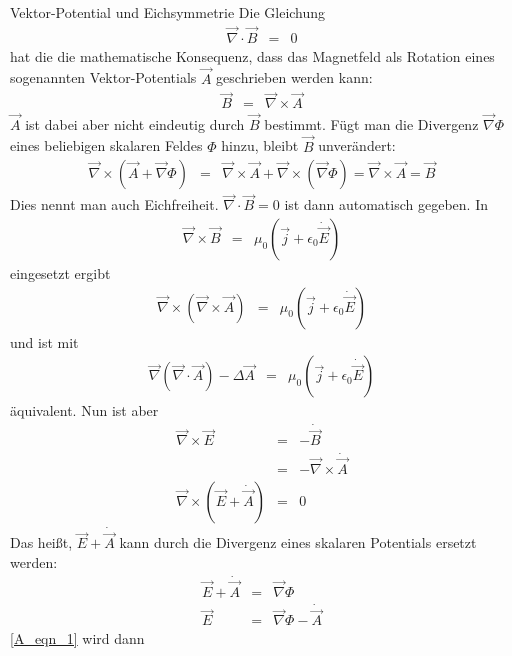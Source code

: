 \begin{chapter}{\titlestr}
\begin{section}{Vektor-Potential und Eichsymmetrie}
Die Gleichung
\begin{eqnarray*}
\vec{\nabla}\cdot\vec{B} &=& 0
\end{eqnarray*}
hat die die mathematische Konsequenz, dass das Magnetfeld als Rotation eines sogenannten Vektor-Potentials $\vec{A}$ geschrieben werden kann:
\begin{eqnarray*}
\vec{B} &=& \vec{\nabla}\times \vec{A}
\end{eqnarray*}
$\vec{A}$ ist dabei aber nicht eindeutig durch $\vec{B}$ bestimmt. Fügt man die Divergenz $\vec{\nabla}\Phi$ eines beliebigen skalaren Feldes $\Phi$ hinzu, bleibt $\vec{B}$ unverändert:
\begin{eqnarray*}
\vec{\nabla}\times \left(\vec{A}+\vec{\nabla}\Phi\right)
&=& \vec{\nabla}\times \vec{A}+\vec{\nabla}\times \left(\vec{\nabla}\Phi\right)=\vec{\nabla}\times \vec{A} = \vec{B}
\end{eqnarray*}
Dies nennt man auch Eichfreiheit. $\vec{\nabla}\cdot\vec{B}=0$ ist dann automatisch gegeben. In
\begin{eqnarray*}
\vec{\nabla}\times\vec{B} &=& \mu_0\left(\vec{j}+\epsilon_0\dot{\vec{E}}\right)
\end{eqnarray*}
eingesetzt ergibt
\begin{eqnarray*}
\vec{\nabla}\times\left(\vec{\nabla}\times \vec{A}\right) &=& \mu_0\left(\vec{j}+\epsilon_0\dot{\vec{E}}\right)
\end{eqnarray*}
und ist mit
\begin{eqnarray}
\label{A_eqn_1}
\vec{\nabla}\left(\vec{\nabla}\cdot\vec{A}\right)-\Delta \vec{A}  &=& \mu_0\left(\vec{j}+\epsilon_0\dot{\vec{E}}\right)
\end{eqnarray}
äquivalent. Nun ist aber
\begin{eqnarray*}
\vec{\nabla}\times\vec{E} &=& -\dot{\vec{B}}\\
&=& -\vec{\nabla}\times{\dot{\vec{A}}}\\
\vec{\nabla}\times\left(\vec{E}+\dot{\vec{A}}\right) &=& 0
\end{eqnarray*}
Das heißt, $\vec{E}+\dot{\vec{A}}$ kann durch die Divergenz eines skalaren Potentials ersetzt werden:
\begin{eqnarray*}
\vec{E}+\dot{\vec{A}} &=& \vec{\nabla}\Phi\\
\vec{E} &=& \vec{\nabla}\Phi-\dot{\vec{A}}
\end{eqnarray*}
\ref{A_eqn_1} wird dann
\begin{eqnarray*}

\end{eqnarray*}
\end{section}
\end{chapter}

